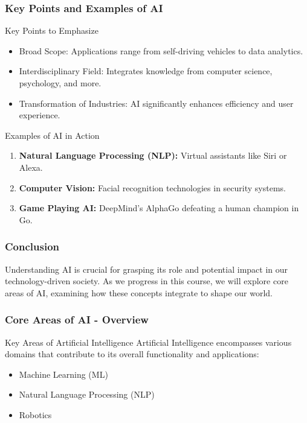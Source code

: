\documentclass[aspectratio=169]{beamer}
\begin{document}
\begin{frame}[fragile]
    \frametitle{Key Points and Examples of AI}
    \begin{block}{Key Points to Emphasize}
        \begin{itemize}
            \item Broad Scope: Applications range from self-driving vehicles to data analytics.
            \item Interdisciplinary Field: Integrates knowledge from computer science, psychology, and more.
            \item Transformation of Industries: AI significantly enhances efficiency and user experience.
        \end{itemize}
    \end{block}

    \begin{block}{Examples of AI in Action}
        \begin{enumerate}
            \item \textbf{Natural Language Processing (NLP):} Virtual assistants like Siri or Alexa.
            \item \textbf{Computer Vision:} Facial recognition technologies in security systems.
            \item \textbf{Game Playing AI:} DeepMind's AlphaGo defeating a human champion in Go.
        \end{enumerate}
    \end{block}
\end{frame}

\begin{frame}[fragile]
    \frametitle{Conclusion}
    Understanding AI is crucial for grasping its role and potential impact in our technology-driven society. As we progress in this course, we will explore core areas of AI, examining how these concepts integrate to shape our world.
\end{frame}

\begin{frame}[fragile]
    \frametitle{Core Areas of AI - Overview}
    \begin{block}{Key Areas of Artificial Intelligence}
        Artificial Intelligence encompasses various domains that contribute to its overall functionality and applications:
    \end{block}
    \begin{itemize}
        \item Machine Learning (ML)
        \item Natural Language Processing (NLP)
        \item Robotics
    \end{itemize}
\end{frame}
\end{document}
